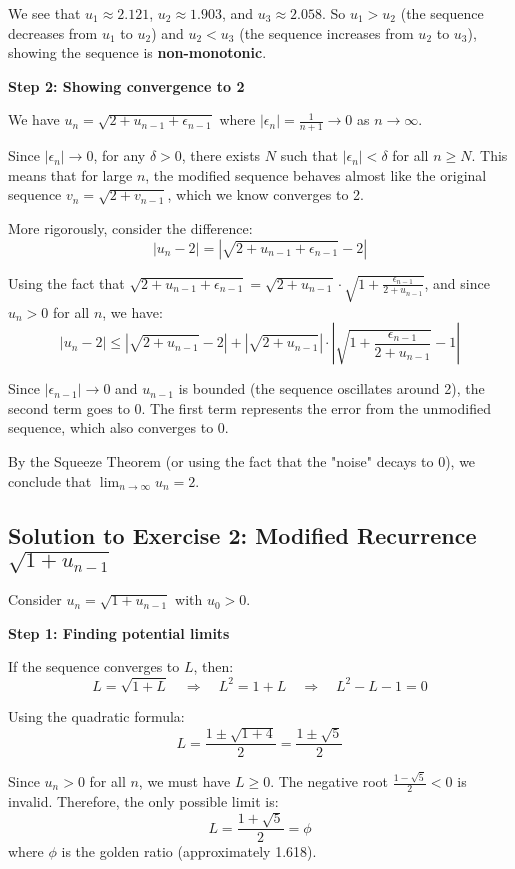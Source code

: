 \documentclass[12pt,a4paper]{article}
\theoremstyle{definition}
\begin{document}
We see that $u_1 \approx 2.121$, $u_2 \approx 1.903$, and $u_3 \approx 2.058$. So $u_1 > u_2$ (the sequence decreases from $u_1$ to $u_2$) and $u_2 < u_3$ (the sequence increases from $u_2$ to $u_3$), showing the sequence is \textbf{non-monotonic}.

\textbf{Step 2: Showing convergence to 2}

We have $u_n = \sqrt{2 + u_{n-1} + \epsilon_{n-1}}$ where $|\epsilon_n| = \frac{1}{n+1} \to 0$ as $n \to \infty$.

Since $|\epsilon_n| \to 0$, for any $\delta > 0$, there exists $N$ such that $|\epsilon_n| < \delta$ for all $n \geq N$. This means that for large $n$, the modified sequence behaves almost like the original sequence $v_n = \sqrt{2 + v_{n-1}}$, which we know converges to 2.

More rigorously, consider the difference:
\[
|u_n - 2| = \left|\sqrt{2 + u_{n-1} + \epsilon_{n-1}} - 2\right|
\]

Using the fact that $\sqrt{2 + u_{n-1} + \epsilon_{n-1}} = \sqrt{2 + u_{n-1}} \cdot \sqrt{1 + \frac{\epsilon_{n-1}}{2 + u_{n-1}}}$, and since $u_n > 0$ for all $n$, we have:
\[
|u_n - 2| \leq \left|\sqrt{2 + u_{n-1}} - 2\right| + \left|\sqrt{2 + u_{n-1}}\right| \cdot \left|\sqrt{1 + \frac{\epsilon_{n-1}}{2 + u_{n-1}}} - 1\right|
\]

Since $|\epsilon_{n-1}| \to 0$ and $u_{n-1}$ is bounded (the sequence oscillates around 2), the second term goes to 0. The first term represents the error from the unmodified sequence, which also converges to 0.

By the Squeeze Theorem (or using the fact that the "noise" decays to 0), we conclude that $\lim_{n \to \infty} u_n = 2$.

\subsection{Solution to Exercise 2: Modified Recurrence $\sqrt{1 + u_{n-1}}$}

Consider $u_n = \sqrt{1 + u_{n-1}}$ with $u_0 > 0$.

\textbf{Step 1: Finding potential limits}

If the sequence converges to $L$, then:
\[
L = \sqrt{1 + L} \quad \Rightarrow \quad L^2 = 1 + L \quad \Rightarrow \quad L^2 - L - 1 = 0
\]

Using the quadratic formula:
\[
L = \frac{1 \pm \sqrt{1 + 4}}{2} = \frac{1 \pm \sqrt{5}}{2}
\]

Since $u_n > 0$ for all $n$, we must have $L \geq 0$. The negative root $\frac{1 - \sqrt{5}}{2} < 0$ is invalid. Therefore, the only possible limit is:
\[
L = \frac{1 + \sqrt{5}}{2} = \phi
\]
where $\phi$ is the golden ratio (approximately 1.618).
\end{document}
